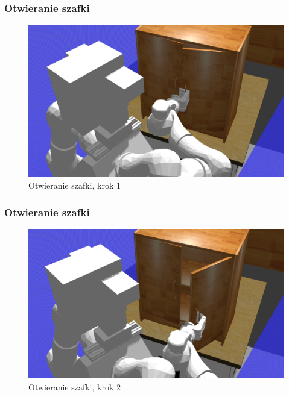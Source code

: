 \addtocounter{framenumber}{-1}
\begin{frame}
	\frametitle{Otwieranie szafki}
	\begin{figure}[b]
        \label{sim_map}
        \centering
        \def\svgwidth{\columnwidth}
        \includegraphics[scale=0.25]{images/testpuszka/otwieranie_start.png}
        \caption{Otwieranie szafki, krok 1}
    \end{figure}
\end{frame}

\addtocounter{framenumber}{-1}
\begin{frame}
	\frametitle{Otwieranie szafki}
	\begin{figure}[b]
        \label{sim_map}
        \centering
        \def\svgwidth{\columnwidth}
        \includegraphics[scale=0.25]{images/testpuszka/otwieranie_koniec.png}
        \caption{Otwieranie szafki, krok 2}
    \end{figure}
\end{frame}

